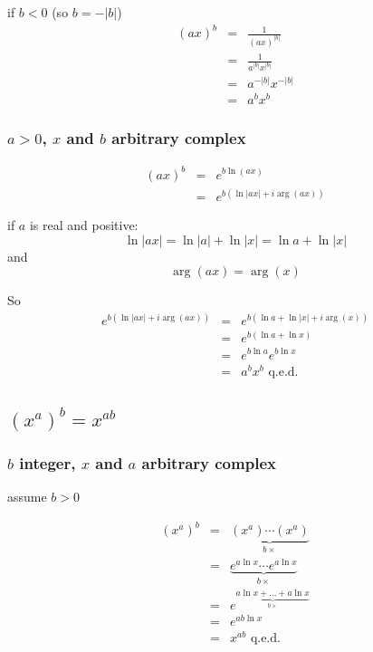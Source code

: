 \documentclass{article}
\begin{document}
if \(b<0\) (so \(b=-|b|\))
\begin{eqnarray}
(ax)^b & = & \frac{1}{(ax)^{|b|}}
\nonumber\\
& = & \frac{1}{a^{|b|} x^{|b|}}
\nonumber\\
& = & a^{-|b|} x^{-|b|}
\nonumber\\
& = & a^b x^b
\end{eqnarray}

\subsubsection{\(a>0\), \(x\) and \(b\) arbitrary complex}

\begin{eqnarray}
(ax)^b & = & e^{b \ln(ax)}
\nonumber\\
& = & e^{b (\ln |ax| + i \arg(ax))}
\end{eqnarray}

if \(a\) is real and positive:
\begin{equation}
\ln |ax| = \ln |a| + \ln |x| = \ln a + \ln |x|
\end{equation}
and 
\begin{equation}
\arg(ax) = \arg(x)
\end{equation}

So
\begin{eqnarray}
e^{b (\ln |ax| + i \arg(ax))} & = &
e^{b (\ln a + \ln |x| + i \arg(x))}
\nonumber\\
& = & e^{b (\ln a + \ln x)}
\nonumber\\
& = & e^{b \ln a} e^{b \ln x}
\nonumber\\
& = & a^b x^b \mbox{ q.e.d.}
\end{eqnarray}

\subsection{\((x^a)^b = x^{ab}\)}

\subsubsection{\(b\) integer, \(x\) and \(a\) arbitrary complex}

assume \(b>0\)

\begin{eqnarray}
(x^a)^b & = & \underbrace{(x^a) \cdots (x^a)}_{b \times}
\nonumber\\
& = & \underbrace{e^{a \ln x} \cdots e^{a \ln x}}_{b \times}
\nonumber\\
& = & e^{\underbrace{\scriptstyle a \ln x + \dots + a \ln x}_{b \times}}
\nonumber\\
& = & e^{a b \ln x}
\nonumber\\
& = & x^{ab} \mbox{ q.e.d.}
\end{eqnarray}
\end{document}
